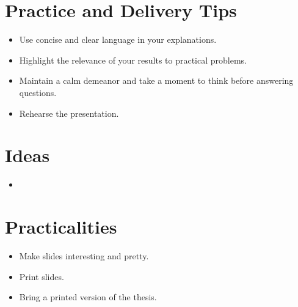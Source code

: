 \documentclass[a4paper,12pt]{article}
\begin{document}
\section{Practice and Delivery Tips}
\begin{itemize}
    \item Use concise and clear language in your explanations.
    \item Highlight the relevance of your results to practical problems.
    \item Maintain a calm demeanor and take a moment to think before answering questions.
    \item Rehearse the presentation.
\end{itemize}

\section{Ideas}

\begin{itemize}
    \item 
\end{itemize}

\section{Practicalities}
\begin{itemize}
    \item Make slides interesting and pretty.
    \item Print slides.
    \item Bring a printed version of the thesis.
\end{itemize}
\end{document}
